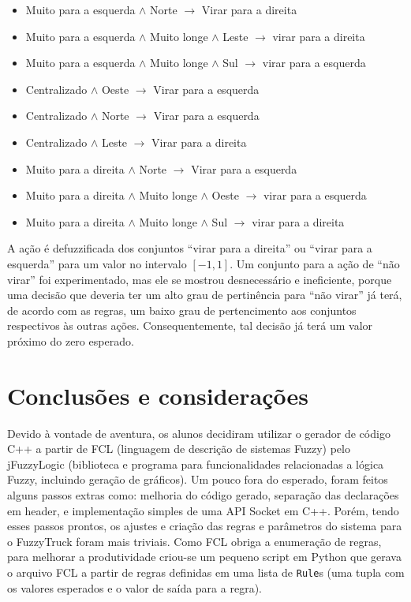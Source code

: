 \documentclass[twocolumn]{article}
\begin{document}
    \begin{itemize}
        \item Muito para a esquerda $\land$ Norte $\rightarrow$ Virar para a
            direita
        \item Muito para a esquerda $\land$ Muito longe $\land$ Leste
            $\rightarrow$ virar para a direita
        \item Muito para a esquerda $\land$ Muito longe $\land$ Sul
            $\rightarrow$ virar para a esquerda
        \item Centralizado $\land$ Oeste $\rightarrow$ Virar para a esquerda
        \item Centralizado $\land$ Norte $\rightarrow$ Virar para a esquerda
        \item Centralizado $\land$ Leste $\rightarrow$ Virar para a direita
        \item Muito para a direita $\land$ Norte $\rightarrow$ Virar para a
            esquerda
        \item Muito para a direita $\land$ Muito longe $\land$ Oeste
            $\rightarrow$ virar para a esquerda
        \item Muito para a direita $\land$ Muito longe $\land$ Sul
            $\rightarrow$ virar para a direita
    \end{itemize}

    A ação é defuzzificada dos conjuntos ``virar para a direita'' ou ``virar
    para a esquerda'' para um valor no intervalo $[-1, 1]$. Um conjunto para a
    ação de ``não virar'' foi experimentado, mas ele se mostrou desnecessário e
    ineficiente, porque uma decisão que deveria ter um alto grau de pertinência
    para ``não virar'' já terá, de acordo com as regras, um baixo grau de
    pertencimento aos conjuntos respectivos às outras ações. Consequentemente,
    tal decisão já terá um valor próximo do zero esperado.

    \section{Conclusões e considerações}

    Devido à vontade de aventura, os alunos decidiram utilizar o gerador de
    código C++ a partir de FCL (linguagem de descrição de sistemas Fuzzy) pelo
    jFuzzyLogic (biblioteca e programa para funcionalidades relacionadas a
    lógica Fuzzy, incluindo geração de gráficos). Um pouco fora do esperado,
    foram feitos alguns passos extras como: melhoria do código gerado,
    separação das declarações em header, e implementação simples de uma API
    Socket em C++. Porém, tendo esses passos prontos, os ajustes e criação das
    regras e parâmetros do sistema para o FuzzyTruck foram mais triviais. Como
    FCL obriga a enumeração de regras, para melhorar a produtividade criou-se
    um pequeno script em Python que gerava o arquivo FCL a partir de regras
    definidas em uma lista de \texttt{Rule}s (uma tupla com os valores
    esperados e o valor de saída para a regra).
\end{document}
